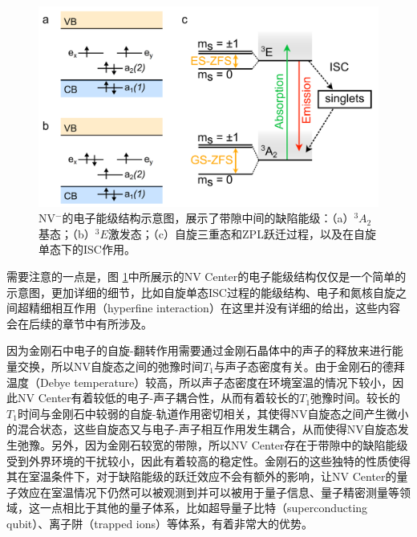 \documentclass[type = bachelor]{whu-thesis}
\begin{document}
\begin{figure}
  \centering
  \includegraphics[width=1.0\textwidth]{figures/Chapter 1/Electronic Structure.png}
  \caption[NV$^-$的电子能级结构示意图]{NV$^-$的电子能级结构示意图，展示了带隙中间的缺陷能级：（a）$^3A_2$基态；（b）$^3E$激发态；（c）自旋三重态和ZPL跃迁过程，以及在自旋单态下的ISC作用\cite{staudacher2015nuclear}。}
  \label{fig: Electronic Structure}
\end{figure}

需要注意的一点是，图 \ref{fig: Electronic Structure}中所展示的NV Center的电子能级结构仅仅是一个简单的示意图，更加详细的细节，比如自旋单态ISC过程的能级结构、电子和氮核自旋之间超精细相互作用（hyperfine interaction）在这里并没有详细的给出，这些内容会在后续的章节中有所涉及。

因为金刚石中电子的自旋-翻转作用需要通过金刚石晶体中的声子的释放来进行能量交换，所以NV自旋态之间的弛豫时间$T_1$与声子态密度有关。由于金刚石的德拜温度（Debye temperature）较高，所以声子态密度在环境室温的情况下较小，因此NV Center有着较低的电子-声子耦合性，从而有着较长的$T_1$弛豫时间\cite{koizumi2008physics}。较长的$T_1$时间与金刚石中较弱的自旋-轨道作用密切相关，其使得NV自旋态之间产生微小的混合状态，这些自旋态又与电子-声子相互作用发生耦合，从而使得NV自旋态发生弛豫。另外，因为金刚石较宽的带隙，所以NV Center存在于带隙中的缺陷能级受到外界环境的干扰较小，因此有着较高的稳定性。金刚石的这些独特的性质使得其在室温条件下，对于缺陷能级的跃迁效应不会有额外的影响，让NV Center的量子效应在室温情况下仍然可以被观测到并可以被用于量子信息、量子精密测量等领域，这一点相比于其他的量子体系，比如超导量子比特（superconducting qubit）、离子阱（trapped ions）等体系，有着非常大的优势\cite{hu2023progress, acosta2013nitrogen}。
\end{document}
